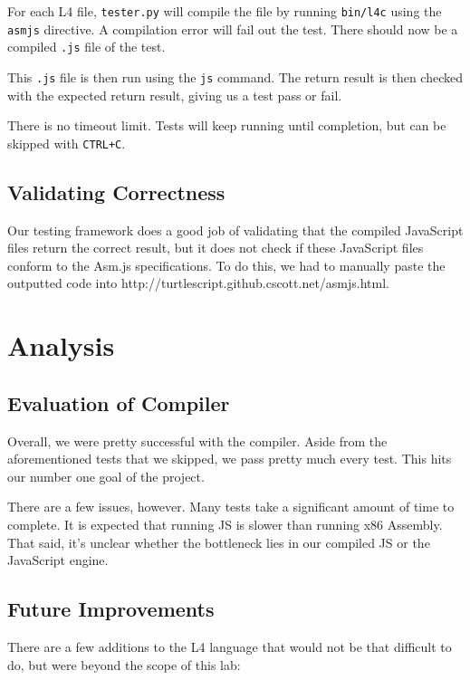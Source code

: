 \documentclass[twoside]{article}
\begin{document}
\begin{multicols}{2}
For each L4 file, \texttt{tester.py} will compile the file by running \texttt{bin/l4c} 
using the \texttt{asmjs} directive. A compilation error will fail out the test. There 
should now be a compiled \texttt{.js} file of the test.

This \texttt{.js} file is then run using the \texttt{js} command. The return
result is then checked with the expected return result, giving us a test pass
or fail.

There is no timeout limit. Tests will keep running until completion, but can be
skipped with \texttt{CTRL+C}.

\subsection{Validating Correctness}

Our testing framework does a good job of validating that the compiled JavaScript
files return the correct result, but it does not check if these JavaScript files
conform to the Asm.js specifications. To do this, we had to manually paste the
outputted code into http://turtlescript.github.cscott.net/asmjs.html.


\section{Analysis}

\subsection{Evaluation of Compiler}

Overall, we were pretty successful with the compiler. Aside from the aforementioned
tests that we skipped, we pass pretty much every test. This hits our number one
goal of the project.

There are a few issues, however. Many tests take a significant amount of time to
complete. It is expected that running JS is slower than running x86 Assembly.
That said, it's unclear whether the bottleneck lies in our compiled JS or the
JavaScript engine.

\subsection{Future Improvements}

There are a few additions to the L4 language that would not be that difficult
to do, but were beyond the scope of this lab:


\end{multicols}
\end{document}
